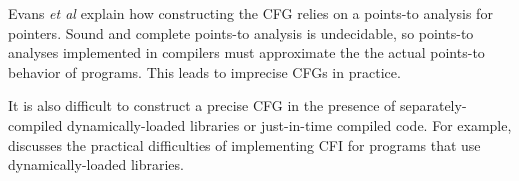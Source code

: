 Evans {\it et al} \cite{Evans2015} explain how constructing the CFG relies on a points-to
analysis for pointers.  Sound and complete points-to analysis is undecidable, so
points-to analyses implemented in compilers must approximate the the actual points-to behavior
of programs.  This leads to imprecise CFGs in practice.

It is also difficult to construct a precise CFG in the presence of separately-compiled
dynamically-loaded libraries or just-in-time compiled code.  For example, \cite{Tice2014} discusses
the practical difficulties of implementing CFI for programs that use 
dynamically-loaded libraries.

 

